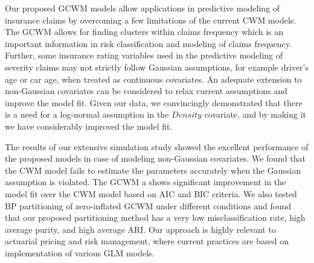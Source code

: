 \documentclass[12pt,letterpaper]{article}
\numberwithin{equation}{section}
\numberwithin{equation}{section}
\numberwithin{equation}{section}
\begin{document}
Our proposed GCWM models allow applications in predictive modeling of insurance claims by overcoming a few limitations of the current CWM models. The GCWM allows for finding clusters within claims frequency which is an important information in risk classification and modeling of claims frequency. Further, some insurance rating variables used in the predictive modeling of severity claims may not strictly follow Gaussian assumptions, for example driver's age or car age, when treated as continuous covariates. An adequate extension to non-Gaussian covariates can be considered to relax current assumptions and improve the model fit. Given our data, we convincingly demonstrated that there is a need for a log-normal assumption in the $Density$ covariate, and by making it we have considerably improved the model fit. 

The results of our extensive simulation study showed the excellent performance of the proposed models in case of modeling non-Gaussian covariates. We found that the CWM model fails to estimate the parameters accurately when the Gaussian assumption is violated. The GCWM a shows significant improvement in the model fit over the CWM model based on AIC and BIC criteria. We also tested BP partitioning of zero-inflated GCWM under different conditions and found that our proposed partitioning method has a very low misclassification rate, high average purity, and high average ARI. Our approach is highly relevant to actuarial pricing and risk management, where current practices are based on implementation of various GLM models. 


\appendix
\end{document}
